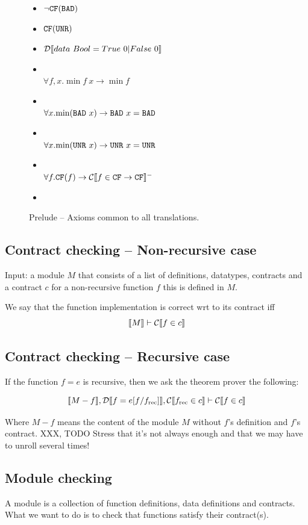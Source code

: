 \documentclass[preprint]{sigplanconf}
\begin{document}
\begin{figure}\label{fig:prelude}
  \begin{itemize}
    \item $\lnot \texttt{CF}(\texttt{BAD})$
    \item $\texttt{CF}(\texttt{UNR})$
    \item $\mathcal{D} \llbracket data~Bool = True~0 | False~0 \rrbracket$
    \item \designChoice\\ $\forall f,x. \min{f ~x} \to \min{f}$
    \item \designChoice\\ $\forall x. \mbox{min}(\texttt{BAD} ~x) \to \texttt{BAD} ~x = \texttt{BAD}$ 
    \item \designChoice\\ $\forall x. \mbox{min}(\texttt{UNR} ~x) \to \texttt{UNR} ~x = \texttt{UNR}$
    \item \designChoice\\ $\forall f. \texttt{CF}(f) \to \mathcal{C} \llbracket f \in \texttt{CF} \to \texttt{CF} \rrbracket^-$
    \item 
  \end{itemize}
  \caption{Prelude -- Axioms common to all translations.}
\end{figure}

\subsection{Contract checking -- Non-recursive case}
Input: a module $M$ that consists of a list of definitions, datatypes,
contracts and a contract $c$ for a non-recursive function $f$ this is
defined in $M$.

We say that the function implementation is correct wrt to its contract
iff $$\llbracket M \rrbracket \vdash \mathcal{C} \llbracket f \in c \rrbracket$$

\subsection{Contract checking -- Recursive case}\label{sec:recursiveContracts}
If the function $f=e$ is recursive, then we ask the theorem prover the
following:

$$\llbracket M - f \rrbracket, \mathcal{D} \llbracket f=e[f/f_\text{rec}] \rrbracket, \mathcal{C} \llbracket f_\text{rec} \in c \rrbracket \vdash \mathcal{C} \llbracket f \in c \rrbracket$$

Where $M - f $ means the content of the module $M$ without $f$'s
definition and $f$'s contract. XXX, TODO Stress that it's not always enough
and that we may have to unroll several times!

\subsection{Module checking}
A module is a collection of function definitions, data definitions and
contracts. What we want to do is to check that functions satisfy their
contract(s). 
\end{document}
